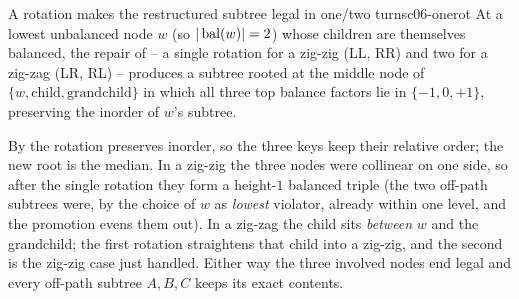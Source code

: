 \begin{lemma}{A rotation makes the restructured subtree legal in one/two turns}{c06-onerot}
At a lowest unbalanced node $w$ (so $|\operatorname{bal}(w)|=2$) whose children are themselves balanced, the repair of
 -- a single rotation for a zig-zig (LL, RR) and two for a zig-zag (LR, RL) --
produces a subtree rooted at the middle node of $\{w,\text{child},\text{grandchild}\}$ in which all
three top balance factors lie in $\{-1,0,+1\}$, preserving the inorder of $w$'s subtree.
\end{lemma}
\begin{proofbox}
By  the rotation preserves inorder, so the three keys keep their relative order; the
new root is the median. In a zig-zig the three nodes were collinear on one side, so after the single
rotation they form a height-$1$ balanced triple (the two off-path subtrees were, by the choice of $w$ as
\emph{lowest} violator, already within one level, and the promotion evens them out). In a zig-zag the
child sits \emph{between} $w$ and the grandchild; the first rotation straightens that child into a
zig-zig, and the second is the zig-zig case just handled. Either way the three involved nodes end legal
and every off-path subtree $A,B,C$ keeps its exact contents. \end{proofbox}

